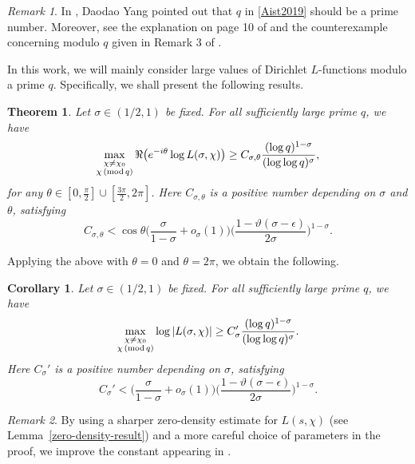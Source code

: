 \documentclass[12pt]{amsart}
\numberwithin{equation}{section}
\theoremstyle{plain}
\newtheorem{thm}{Theorem}
\newtheorem{cor}{Corollary}
\theoremstyle{remark}
\newtheorem{remark}{Remark}
\theoremstyle{definition}
\theoremstyle{remark}
\renewcommand{\mod}[1]{\,({\rm mod}\,#1)}
\begin{document}
\begin{remark}
In \cite{Yangdaodao2023}, Daodao Yang pointed out that $q$ in  \eqref{Aist2019} should be a prime number. Moreover, see the explanation on page 10 of \cite{Yangdaodao2023} and the counterexample concerning modulo $q$ given in Remark 3 of \cite{Yangdaodao2024}.
\end{remark}

 In this work, we will mainly consider large values of Dirichlet $L$-functions modulo a prime $q$. Specifically, we shall present the following results.
\begin{thm}\label{main-thm-1}
Let $\sigma\in(1/2,1)$ be fixed. For all sufficiently large prime $q$, we have
\begin{equation*}
\begin{aligned}
\max_{\substack{\chi\neq\chi_0\\ \chi\mod q}}
\Re\big(e^{-i\theta}\log L(\sigma,\chi)\big)\geq C_{\sigma,\theta}\frac{(\log q)^{1-\sigma}}{(\log\log q)^{\sigma}},
\end{aligned}
\end{equation*}
for any $\theta\in[0,\frac{\pi}{2}]\cup[\frac{3\pi}{2},2\pi]$. Here $C_{\sigma,\theta}$ is a positive number depending on $\sigma$ and $\theta$, satisfying
\[
C_{\sigma,\theta}<\cos\theta\bigg(\frac{\sigma}{1-\sigma}+o_{\sigma}(1)\bigg)
\bigg(\frac{1-\vartheta(\sigma-\epsilon)}{2\sigma}\bigg)^{1-\sigma}.
\]
\end{thm}

Applying the above with $\theta=0$ and $\theta=2\pi$, we obtain the following.

\begin{cor}\label{main-cor-1}
Let $\sigma\in(1/2,1)$ be fixed. For all sufficiently large prime $q$, we have
\begin{equation*}
\begin{aligned}
\max_{\substack{\chi\neq\chi_0\\ \chi\mod q}}
\log |L(\sigma,\chi)|\geq C_{\sigma}'\frac{(\log q)^{1-\sigma}}{(\log\log q)^{\sigma}}.
\end{aligned}
\end{equation*}
Here $C_{\sigma}'$ is a positive number depending on $\sigma$, satisfying
\[
C_{\sigma}'<\bigg(\frac{\sigma}{1-\sigma}+o_{\sigma}(1)\bigg)
\bigg(\frac{1-\vartheta(\sigma-\epsilon)}{2\sigma}\bigg)^{1-\sigma}.
\]
\end{cor}

\begin{remark}
By using a sharper zero-density estimate for $L(s,\chi)$ (see Lemma~\ref{zero-density-result}) and a more careful choice of parameters in the proof, we improve the constant appearing in \cite{Xiao2022}.
\end{remark}
\end{document}
